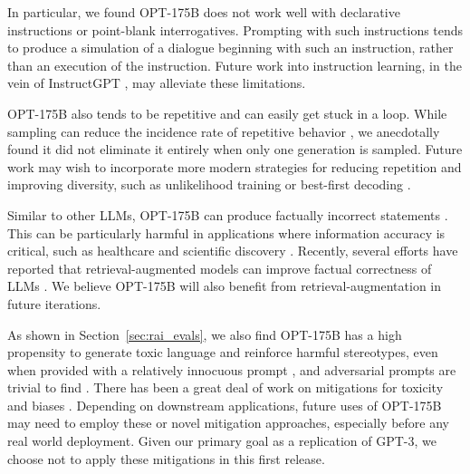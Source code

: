 \documentclass[11pt]{article}
\newcommand{\OPT}[0]{{OPT-175B}}
\newcommand{\biggpt}[1]{{GPT-3#1}}
\begin{document}
In particular, we found \OPT{} does not work well with declarative instructions or point-blank interrogatives. Prompting with such instructions tends to produce a simulation of a dialogue beginning with such an instruction, rather than an execution of the instruction. Future work into instruction learning, in the vein of InstructGPT \cite{ouyang2022training}, may alleviate these limitations.

\OPT{} also tends to be repetitive and can easily get stuck in a loop. While sampling can reduce the incidence rate of repetitive behavior \cite{holtzman2020nucleus}, we anecdotally found it did not eliminate it entirely when only one generation is sampled. Future work may wish to incorporate more modern strategies for reducing repetition and improving diversity, such as unlikelihood training \cite{welleck2019neuraltext} or best-first decoding \cite{meister-etal-2020-best}.

Similar to other LLMs, \OPT{} can produce factually incorrect statements \cite{adiwardana2020meena,brown2020gpt3, roller-etal-2021-recipes,gopher2022,palm2022,thoppilan2022lamda}. This can be particularly harmful in applications where information accuracy is critical, such as healthcare and scientific discovery \cite{weidinger2021ethical}. Recently, several efforts have reported that retrieval-augmented models can improve factual correctness of LLMs \cite{lewis2020retrieval,komeili2021woi,thoppilan2022lamda,borgeaud2021improving,shuster2022language,nakano2021webgpt}. We believe \OPT{} will also benefit from retrieval-augmentation in future iterations.

As shown in Section~\ref{sec:rai_evals}, we also find \OPT{} has a high propensity to generate toxic language and reinforce harmful stereotypes, even when provided with a relatively innocuous prompt \cite{gehman2020realtoxicityprompts}, and adversarial prompts are trivial to find \cite{dinan2021anticipating}. There has been a great deal of work on mitigations for toxicity and biases \cite{dathathri2019plug,dinan2019build,sheng2019woman,dinan-etal-2020-queens,liu2019does,krause2020gedi,xu2020recipes,liang2021towards,dinan2021anticipating,xu-etal-2021-bot,dhamala2021bold,schick2021self,ouyang2022training}. Depending on downstream applications, future uses of \OPT{} may need to employ these or novel mitigation approaches, especially before any real world deployment. Given our primary goal as a replication of \biggpt{}, we choose not to apply these mitigations in this first release.
\end{document}
